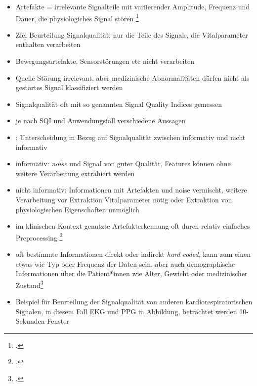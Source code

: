 	\begin{itemize}
		\item Artefakte = irrelevante Signalteile mit variierender Amplitude, Frequenz und Dauer, die physiologiches Signal stören \footcite{Nizami2013}
		\item Ziel Beurteilung Signalqualität: nur die Teile des Signals, die Vitalparameter enthalten verarbeiten
		\item Bewegungsartefakte, Sensorstörungen etc nicht verarbeiten
		\item Quelle Störung irrelevant, aber medizinische Abnormalitäten dürfen nicht als gestörtes Signal klassifiziert werden
		\item Signalqualität oft mit so genannten Signal Quality Indices gemessen
		\item je nach SQI und Anwendungsfall verschiedene Aussagen
		\item \citeauthor{Sadek2016}: Unterscheidung in Bezug auf Signalqualität zwischen informativ und nicht informativ
		\item informativ: \textit{noise} und Signal von guter Qualität, Features können ohne weitere Verarbeitung extrahiert werden
		\item nicht informativ: Informationen mit Artefakten und noise vermischt, weitere Verarbeitung vor Extraktion Vitalparameter nötig oder Extraktion von physiologischen Eigenschaften unmöglich
		\item im klinischen Kontext genutzte Artefakterkennung oft durch relativ einfaches Preprocessing \footcite[Vgl.][]{Nizami2013}
		\item oft bestimmte Informationen direkt oder indirekt \textit{hard coded}, kann zum einen etwas wie Typ oder Frequenz der Daten sein, aber auch demographische Informationen über die Patient*innen wie Alter, Gewicht oder medizinischer Zustand\footcite[Vgl.][]{Nizami2013}
		\item Beispiel für Beurteilung der Signalqualität von anderen kardiorespiratorischen Signalen, in diesem Fall \ac{EKG} und \ac{PPG} in Abbildung, betrachtet werden 10-Sekunden-Fenster %
	\end{itemize}
	

